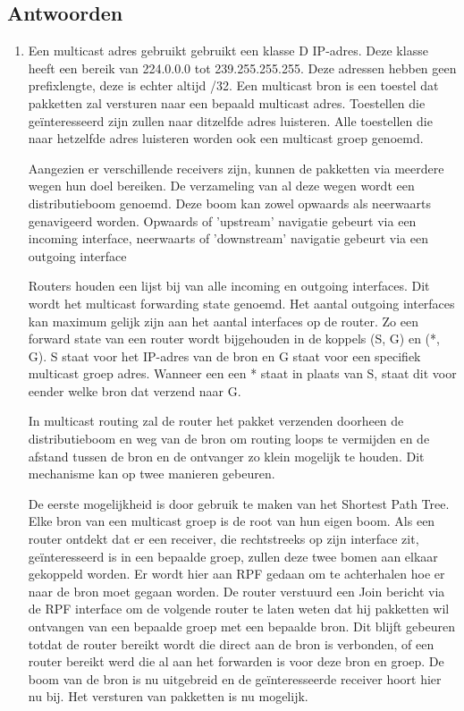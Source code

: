 \documentclass{report}
\begin{document}
\subsection{Antwoorden}
\begin{enumerate}
	\item Een multicast adres gebruikt gebruikt een klasse D IP-adres. Deze klasse heeft een bereik van 224.0.0.0 tot 239.255.255.255. Deze adressen hebben geen prefixlengte, deze is echter altijd /32. Een multicast bron is een toestel dat pakketten zal versturen naar een bepaald multicast adres. Toestellen die geïnteresseerd zijn zullen naar ditzelfde adres luisteren. Alle toestellen die naar hetzelfde adres luisteren worden ook een multicast groep genoemd. 
	
Aangezien er verschillende receivers zijn, kunnen de pakketten via meerdere wegen hun doel bereiken.  De verzameling van al deze wegen wordt een distributieboom genoemd. Deze boom kan zowel opwaards als neerwaarts genavigeerd worden. Opwaards of 'upstream' navigatie gebeurt via een incoming interface, neerwaarts of 'downstream' navigatie gebeurt via een outgoing interface

Routers houden een lijst bij van alle incoming en outgoing interfaces. Dit wordt het multicast forwarding state genoemd. Het aantal outgoing interfaces kan maximum gelijk zijn aan het aantal interfaces op de router. Zo een forward state van een router wordt bijgehouden in de koppels (S, G) en (*, G). S staat voor het IP-adres van de bron en G staat voor een specifiek multicast groep adres. Wanneer een een * staat in plaats van S, staat dit voor eender welke bron dat verzend naar G.

In multicast routing zal de router het pakket verzenden doorheen de distributieboom en weg van de bron om routing loops te vermijden en de afstand tussen de bron en de ontvanger zo klein mogelijk te houden. Dit mechanisme kan op twee manieren gebeuren.

De eerste mogelijkheid is door gebruik te maken van het Shortest Path Tree.  Elke bron van een multicast groep is de root van hun eigen boom. Als een router ontdekt dat er een receiver, die rechtstreeks op zijn interface zit, geïnteresseerd is in een bepaalde groep, zullen deze twee bomen aan elkaar gekoppeld worden. Er wordt hier aan RPF gedaan om te achterhalen hoe er naar de bron moet gegaan worden. De router verstuurd een Join bericht via de RPF interface om de volgende router te laten weten dat hij pakketten wil ontvangen van een bepaalde groep met een bepaalde bron. Dit blijft gebeuren totdat de router bereikt wordt die direct aan de bron is verbonden, of een router bereikt werd die al aan het forwarden is voor deze bron en groep. De boom van de bron is nu uitgebreid en de geïnteresseerde receiver hoort hier nu bij. Het versturen van pakketten is nu mogelijk.


\end{enumerate}
\end{document}
